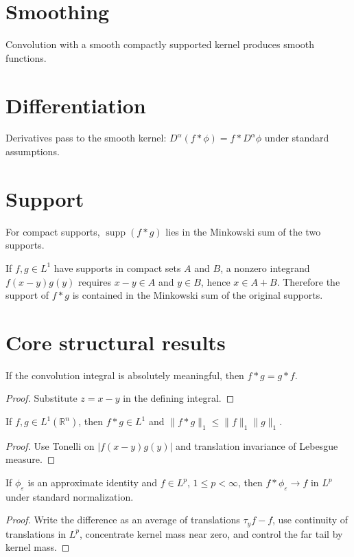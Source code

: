 \section{Smoothing}
Convolution with a smooth compactly supported kernel produces smooth functions.

\section{Differentiation}
Derivatives pass to the smooth kernel: $D^\alpha(f*\phi)=f*D^\alpha\phi$ under standard assumptions.

\section{Support}
For compact supports, $\operatorname{supp}(f*g)$ lies in the Minkowski sum of the two supports.


\begin{example}\label{ex:iii10-expand-03}
If \(f,g\in L^1\) have supports in compact sets \(A\) and \(B\), a nonzero
integrand \(f(x-y)g(y)\) requires \(x-y\in A\) and \(y\in B\), hence
\(x\in A+B\). Therefore the support of \(f*g\) is contained in the Minkowski
sum of the original supports.
\end{example}
\section{Core structural results}

\begin{theorem}[Commutativity]\label{thm:iii10-01}
If the convolution integral is absolutely meaningful, then $f*g=g*f$.
\begin{proof}
Substitute $z=x-y$ in the defining integral.
\end{proof}
\end{theorem}

\begin{theorem}\label{thm:iii10-02}
If $f,g\in L^1(\mathbb R^n)$, then $f*g\in L^1$ and $\|f*g\|_1\le\|f\|_1\|g\|_1$.
\begin{proof}
Use Tonelli on $|f(x-y)g(y)|$ and translation invariance of Lebesgue measure.
\end{proof}
\end{theorem}

\begin{theorem}\label{thm:iii10-03}
If $\phi_\varepsilon$ is an approximate identity and $f\in L^p$, $1\le p<\infty$, then $f*\phi_\varepsilon\to f$ in $L^p$ under standard normalization.
\begin{proof}
Write the difference as an average of translations $\tau_yf-f$, use continuity of translations in $L^p$, concentrate kernel mass near zero, and control the far tail by kernel mass.
\end{proof}
\end{theorem}

